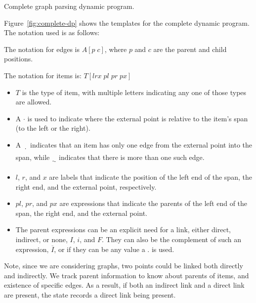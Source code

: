 \begin{algorithm}

\caption{
  \label{fig:complete-dp}
  Complete graph parsing dynamic program.
}
\end{algorithm}

Figure~\ref{fig:complete-dp} shows the templates for the complete dynamic program.
The notation used is as follows:

The notation for edges is $A[p \; c]$, where $p$ and $c$ are the parent and child positions.

The notation for items is: $T[lrx \; pl \; pr \; px]$

\begin{itemize}
  \item $T$ is the type of item, with multiple letters indicating any one of those types are allowed.
  \item A $\cdotp$ is used to indicate where the external point is relative to the item's span (to the left or the right).
  \item A $\dotuline{\hspace{2mm}}$ indicates that an item has only one edge from the external point into the span, while $\uwave{\hspace{2mm}}$ indicates that there is more than one such edge.
  \item $l$, $r$, and $x$ are labels that indicate the position of the left end of the span, the right end, and the external point, respectively.
  \item $pl$, $pr$, and $px$ are expressions that indicate the parents of the left end of the span, the right end, and the external point.
  \item The parent expressions can be an explicit need for a link, either direct, indirect, or none, \myeg $I$, $i$, and $F$.
  They can also be the complement of such an expression, \myeg $\overline{I}$, or if they can be any value a $.$ is used.
\end{itemize}

Note, since we are considering graphs, two points could be linked both directly and indirectly.
We track parent information to know about parents of items, and existence of specific edges.
As a result, if both an indirect link and a direct link are present, the state records a direct link being present.

